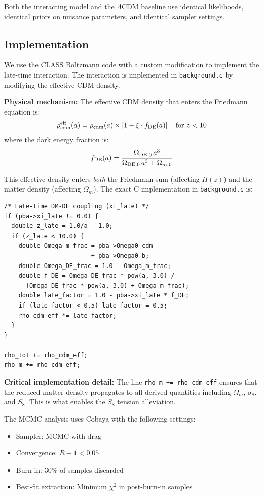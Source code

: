\documentclass[twocolumn,showpacs,preprintnumbers,amsmath,amssymb,prd]{revtex4-2}
\begin{document}
Both the interacting model and the $\Lambda$CDM baseline use identical likelihoods, identical priors on nuisance parameters, and identical sampler settings.

\subsection{Implementation}

We use the CLASS Boltzmann code \cite{CLASS2011} with a custom modification to implement the late-time interaction. The interaction is implemented in \texttt{background.c} by modifying the effective CDM density.

\textbf{Physical mechanism:} The effective CDM density that enters the Friedmann equation is:
\begin{equation}
\rho_{\rm cdm}^{\rm eff}(a) = \rho_{\rm cdm}(a) \times \left[1 - \xi \cdot f_{\rm DE}(a)\right] \quad \text{for } z < 10
\label{eq:rho_eff}
\end{equation}
where the dark energy fraction is:
\begin{equation}
f_{\rm DE}(a) = \frac{\Omega_{\rm DE,0} \, a^3}{\Omega_{\rm DE,0} \, a^3 + \Omega_{m,0}}
\end{equation}

This effective density enters \textit{both} the Friedmann sum (affecting $H(z)$) and the matter density (affecting $\Omega_m$). The exact C implementation in \texttt{background.c} is:
\begin{verbatim}
/* Late-time DM-DE coupling (xi_late) */
if (pba->xi_late != 0.0) {
  double z_late = 1.0/a - 1.0;
  if (z_late < 10.0) {
    double Omega_m_frac = pba->Omega0_cdm 
                        + pba->Omega0_b;
    double Omega_DE_frac = 1.0 - Omega_m_frac;
    double f_DE = Omega_DE_frac * pow(a, 3.0) / 
      (Omega_DE_frac * pow(a, 3.0) + Omega_m_frac);
    double late_factor = 1.0 - pba->xi_late * f_DE;
    if (late_factor < 0.5) late_factor = 0.5;
    rho_cdm_eff *= late_factor;
  }
}

rho_tot += rho_cdm_eff;
rho_m += rho_cdm_eff;
\end{verbatim}

\textbf{Critical implementation detail:} The line \texttt{rho\_m += rho\_cdm\_eff} ensures that the reduced matter density propagates to all derived quantities including $\Omega_m$, $\sigma_8$, and $S_8$. This is what enables the $S_8$ tension alleviation.

The MCMC analysis uses Cobaya \cite{Cobaya2021} with the following settings:
\begin{itemize}
    \item Sampler: MCMC with drag
    \item Convergence: $R-1 < 0.05$
    \item Burn-in: 30\% of samples discarded
    \item Best-fit extraction: Minimum $\chi^2$ in post-burn-in samples
\end{itemize}
\end{document}
